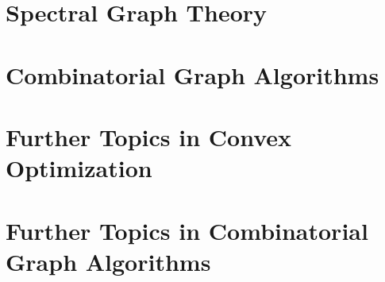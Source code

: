 \documentclass[12pt,a4paper,openany]{book}
\begin{document}
 \part{Spectral Graph Theory}
 \label{part:sg}
 
 
 
 
 
 




 \part{Combinatorial Graph Algorithms}
 \label{part:combinatorial}
 
 
 

\part{Further Topics in Convex Optimization}
\label{part:more}




\part{Further Topics in Combinatorial Graph Algorithms}






\end{document}
